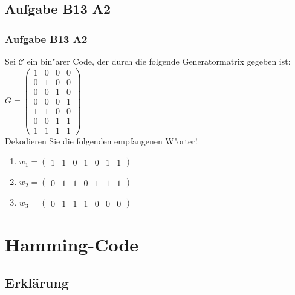 \subsection{Aufgabe B13 A2}
\begin{frame}
\frametitle{Aufgabe B13 A2}
Sei $\mathcal{C}$ ein bin"arer Code, der durch die folgende Generatormatrix gegeben
ist:\\[4pt]
$G = \left( \begin{array}{cccc}
1 & 0 & 0 & 0 \\
0 & 1 & 0 & 0 \\
0 & 0 & 1 & 0 \\
0 & 0 & 0 & 1 \\
1 & 1 & 0 & 0 \\
0 & 0 & 1 & 1 \\
1 & 1 & 1 & 1
\end{array} \right)$\\[4pt]
Dekodieren Sie die folgenden empfangenen W"orter!
\begin{enumerate}
\item $w_1 = (\begin{array}{ccccccc}1 & 1 & 0 & 1 & 0 & 1 & 1\end{array})$
\item $w_2 = (\begin{array}{ccccccc}0 & 1 & 1 & 0 & 1 & 1 & 1\end{array})$
\item $w_3 = (\begin{array}{ccccccc}0 & 1 & 1 & 1 & 0 & 0 & 0\end{array})$
\end{enumerate}
\end{frame}


\section{Hamming-Code}
\subsection{Erklärung}

